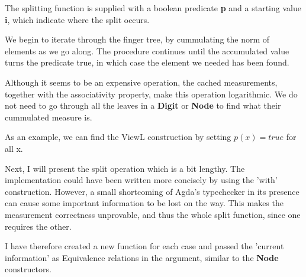 \documentclass[12pt,twoside,notitlepage]{report}
\begin{document}
The splitting function is supplied with a boolean predicate \textbf{p} and a starting value \textbf{i}, which indicate where the split occurs. 

We begin to iterate through the finger tree, by cummulating the norm of elements as we go along. The procedure continues until the accumulated value turns the predicate true, in which case the element we needed has been found.

Although it seems to be an expensive operation, the cached measurements, together with the associativity property, make this operation logarithmic. We do not need to go through all the leaves in a \textbf{Digit} or \textbf{Node} to find what their cummulated measure is.

As an example, we can find the ViewL construction by setting $p(x) = true$ for all x.


Next, I will present the split operation which is a bit lengthy. The implementation could have been written more concisely by using the 'with' construction. However, a small shortcoming of Agda's typechecker in its presence can cause some important information to be lost on the way. This makes the measurement correctness unprovable, and thus the whole split function, since one requires the other.

I have therefore created a new function for each case and passed the 'current information' as Equivalence relations in the argument, similar to the \textbf{Node} constructors.
\end{document}
